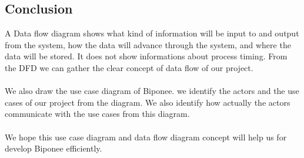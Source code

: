 \subsection{Conclusion}
 \begin{itemize}
    A Data flow diagram shows what kind of information will be input to and output from the system, how the data will advance through the system, and where the data will be stored. It does not show informations about process timing. From the DFD we can gather the clear concept of data flow of our project.\\
    \\
    
    We also draw the use case diagram of Biponee. we identify the actors and the use cases of our project from the diagram. We also identify how actually the actors communicate with the use cases from this diagram.\\
    \\
    
    We hope this use case diagram and data flow diagram concept will help us for develop Biponee
    efficiently.\\
     
 \end{itemize}
